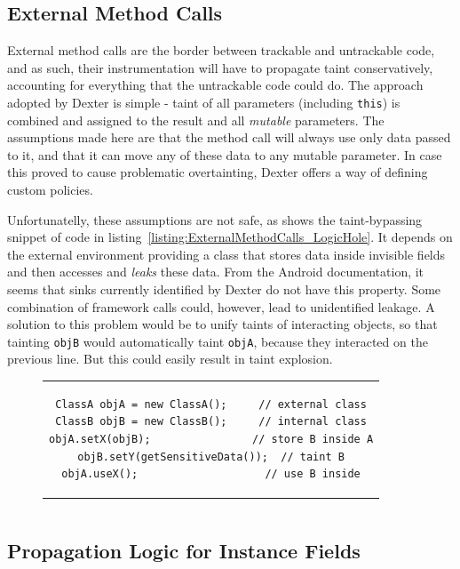 \documentclass[12pt,twoside,notitlepage]{report}
\begin{document}
\subsection{External Method Calls}

External method calls are the border between trackable and untrackable code, and as such, their instrumentation will have to propagate taint conservatively, accounting for everything that the untrackable code could do. The approach adopted by Dexter is simple - taint of all parameters (including \verb$this$) is combined and assigned to the result and all \emph{mutable} parameters. The assumptions made here are that the method call will always use only data passed to it, and that it can move any of these data to any mutable parameter. In case this proved to cause problematic overtainting, Dexter offers a way of defining custom policies.

Unfortunatelly, these assumptions are not safe, as shows the taint-bypassing snippet of code in listing~\ref{listing:ExternalMethodCalls_LogicHole}. It depends on the external environment providing a class that stores data inside invisible fields and then accesses and \emph{leaks} these data. From the Android documentation, it seems that sinks currently identified by Dexter do not have this property. Some combination of framework calls could, however, lead to unidentified leakage. A solution to this problem would be to unify taints of interacting objects, so that tainting \verb$objB$ would automatically taint \verb$objA$, because they interacted on the previous line. But this could easily result in taint explosion.

\begin{figure}[h]
	\centering
	\begin{tabular}{c}
	\begin{lstlisting}
ClassA objA = new ClassA();     // external class
ClassB objB = new ClassB();     // internal class
objA.setX(objB);                // store B inside A
objB.setY(getSensitiveData());  // taint B
objA.useX();                    // use B inside
	\end{lstlisting}
	\end{tabular}
	\begin{lstlisting}[caption={Example of a propagation logic hole},
	                   label={listing:ExternalMethodCalls_LogicHole}]
	\end{lstlisting}
\end{figure}

\subsection{Propagation Logic for Instance Fields}
\end{document}
